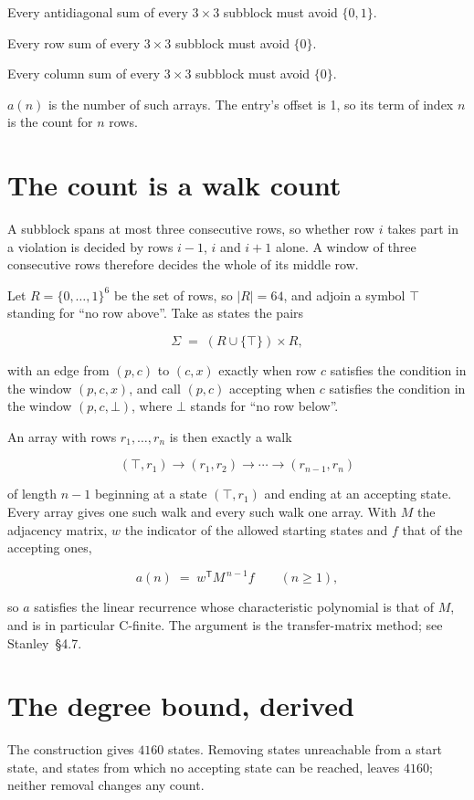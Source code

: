 \documentclass[11pt]{article}
\theoremstyle{definition}
\begin{document}
Every antidiagonal sum of every $3\times3$ subblock must avoid $\{0, 1\}$.

Every row sum of every $3\times3$ subblock must avoid $\{0\}$.

Every column sum of every $3\times3$ subblock must avoid $\{0\}$.

$a(n)$ is the number of such arrays. The entry's offset is 1, so its term of index $n$ is the count for $n$ rows.

\section{The count is a walk count}

A subblock spans at most three consecutive rows, so whether row $i$ takes part in a violation is decided by rows $i-1$, $i$ and $i+1$ alone. A window of three consecutive rows therefore decides the whole of its middle row.

Let $R = \{0,\dots,1\}^{6}$ be the set of rows, so $|R| = 64$, and adjoin a symbol $\top$ standing for ``no row above''. Take as states the pairs

\[\Sigma \;=\; (R \cup \{\top\}) \times R,\]

with an edge from $(p,c)$ to $(c,x)$ exactly when row $c$ satisfies the condition in the window $(p,c,x)$, and call $(p,c)$ accepting when $c$ satisfies the condition in the window $(p,c,\bot)$, where $\bot$ stands for ``no row below''.

An array with rows $r_1,\dots,r_n$ is then exactly a walk

\[(\top,r_1) \to (r_1,r_2) \to \cdots \to (r_{n-1},r_n)\]

of length $n-1$ beginning at a state $(\top,r_1)$ and ending at an accepting state. Every array gives one such walk and every such walk one array. With $M$ the adjacency matrix, $w$ the indicator of the allowed starting states and $f$ that of the accepting ones,

\[a(n) \;=\; w^{\mathsf T} M^{\,n-1} f \qquad (n \ge 1),\]

so $a$ satisfies the linear recurrence whose characteristic polynomial is that of $M$, and is in particular C-finite. The argument is the transfer-matrix method; see Stanley~\S4.7.

\section{The degree bound, derived}

The construction gives $4160$ states. Removing states unreachable from a start state, and states from which no accepting state can be reached, leaves $4160$; neither removal changes any count.
\end{document}
